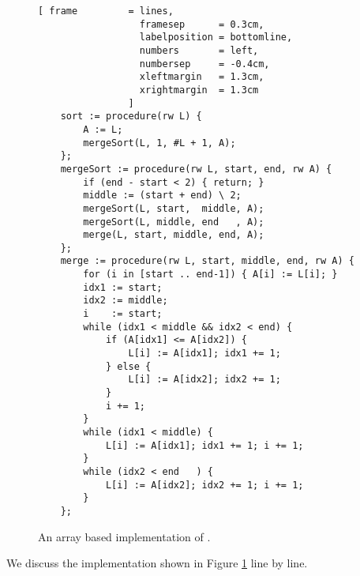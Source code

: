 \begin{figure}[!ht]
  \centering
\begin{Verbatim}[ frame         = lines, 
                  framesep      = 0.3cm, 
                  labelposition = bottomline,
                  numbers       = left,
                  numbersep     = -0.4cm,
                  xleftmargin   = 1.3cm,
                  xrightmargin  = 1.3cm
                ]
    sort := procedure(rw L) {
        A := L;
        mergeSort(L, 1, #L + 1, A); 
    };
    mergeSort := procedure(rw L, start, end, rw A) {
        if (end - start < 2) { return; }
        middle := (start + end) \ 2;
        mergeSort(L, start,  middle, A);  
        mergeSort(L, middle, end   , A);   
        merge(L, start, middle, end, A); 
    };
    merge := procedure(rw L, start, middle, end, rw A) {    
        for (i in [start .. end-1]) { A[i] := L[i]; }
        idx1 := start;
        idx2 := middle;
        i    := start;
        while (idx1 < middle && idx2 < end) {
            if (A[idx1] <= A[idx2]) {
                L[i] := A[idx1]; idx1 += 1;
            } else {
                L[i] := A[idx2]; idx2 += 1;
            }
            i += 1; 
        }
        while (idx1 < middle) { 
            L[i] := A[idx1]; idx1 += 1; i += 1; 
        }
        while (idx2 < end   ) { 
            L[i] := A[idx2]; idx2 += 1; i += 1; 
        }
    };
\end{Verbatim}
\vspace*{-0.3cm}
  \caption{An array based implementation of .}
  \label{fig:merge-sort-array.stlx}
\end{figure}
We discuss the implementation shown in Figure \ref{fig:merge-sort-array.stlx} line by line.
